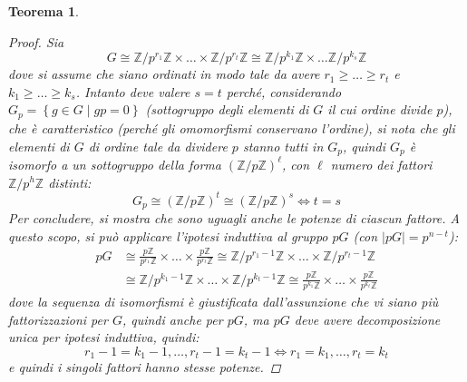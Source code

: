 \documentclass[11pt]{scrartcl}
\theoremstyle{style1}
\newtheorem{teorema}{Teorema}[section]
\numberwithin{equation}{subsection}
\begin{document}
\begin{teorema}
\begin{proof}
Sia 
\[
G \cong \mathbb{Z}/ p^{r_1} \mathbb{Z} \times \ldots \times \mathbb{Z}/ p^{r_t} \mathbb{Z} \cong \mathbb{Z}/ p^{k_1} \mathbb{Z}\times \ldots\mathbb{Z}/p^{k_s} \mathbb{Z}
\] 
dove si assume che siano ordinati in modo tale da avere $r_1\ge \ldots\ge r_t $ e $k_1\ge \ldots\ge k_s$.
Intanto deve valere $s=t$ perch\'e, considerando $G_p = \left\{ g \in G  \mid gp = 0 \right\} $ (sottogruppo degli elementi di $G$ il cui ordine divide $p$), che \`e caratteristico (perch\'e gli omomorfismi conservano l'ordine), si nota che gli elementi di $G$ di ordine tale da dividere $p$ stanno tutti in $G_p$, quindi $G_p$ \`e isomorfo a un sottogruppo della forma $(\mathbb{Z} / p\mathbb{Z})^\ell $, con $\ell $ numero dei fattori $\mathbb{Z} / p^h \mathbb{Z}$ distinti:
\[
G_p \cong (\mathbb{Z}/p\mathbb{Z})^t \cong (\mathbb{Z}/p\mathbb{Z})^s \iff t= s
\] 
Per concludere, si mostra che sono uguagli anche le potenze di ciascun fattore.
A questo scopo, si pu\`o applicare l'ipotesi induttiva al gruppo $pG$ (con $\lvert pG \rvert =p^{n-t} $):
\[
	\begin{split}
		pG &\cong \frac{p\mathbb{Z}}{p^{r_1} \mathbb{Z}} \times \ldots\times \frac{p\mathbb{Z}}{p^{r_t} \mathbb{Z}}\cong \mathbb{Z}/p^{r_1-1} \mathbb{Z} \times  \ldots \times \mathbb{Z}/p^{r_t - 1} \mathbb{Z}\\
		   &\cong \mathbb{Z}/p^{k_1-1} \mathbb{Z}\times \ldots\times \mathbb{Z}/p^{k_t-1} \mathbb{Z}\cong \frac{p\mathbb{Z}}{p^{k_1} \mathbb{Z}}\times \ldots \times \frac{p\mathbb{Z}}{p^{k_t} \mathbb{Z}}
	\end{split}
\] 
dove la sequenza di isomorfismi \`e giustificata dall'assunzione che vi siano pi\`u fattorizzazioni per $G$, quindi anche per $pG$, ma $pG$ deve avere decomposizione unica per ipotesi induttiva, quindi:
\[
r_1-1=k_1-1, \ldots, r_t - 1 = k_t - 1 \iff r_1=k_1,\ldots,r_t = k_t
\] 
e quindi i singoli fattori hanno stesse potenze.
	\end{proof}
\end{teorema}
\end{document}

